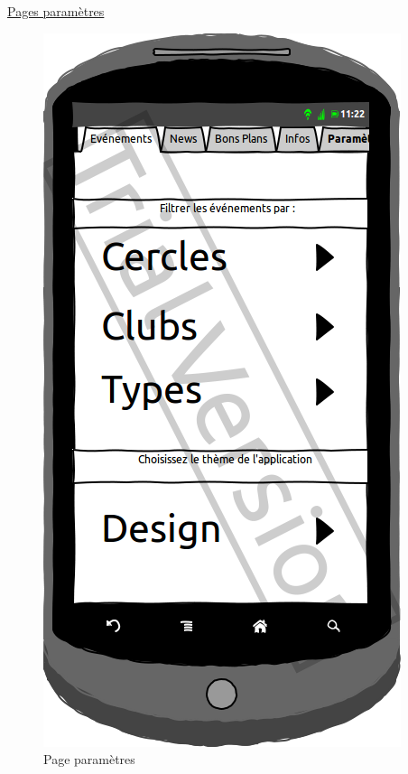 \documentclass[a4paper, 11pt]{article}
\begin{document}
\underline{Pages paramètres}\\
\begin{figure}[h!]
	\begin{minipage}[c]{.33\linewidth}
		\begin{center}
			\includegraphics[scale=0.3]{../../Sketch/Android/Param.png}
		\end{center}
	\caption{Page paramètres}
	\end{minipage}
	\hfill
	\begin{minipage}[c]{.33\linewidth}
		\begin{center}

\end{center}
\end{minipage}
\end{figure}
\end{document}
